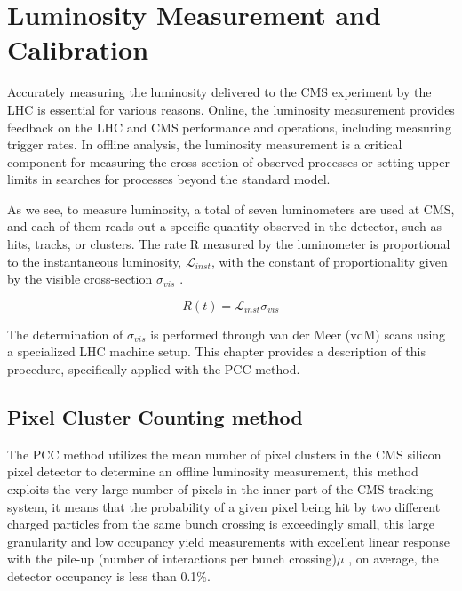 \chapter{Luminosity  Measurement and Calibration}
\label{ch3}

Accurately measuring the luminosity delivered to the CMS experiment by the LHC is essential for various reasons. Online, the luminosity measurement provides feedback on the LHC and CMS performance and operations, including measuring trigger rates. In offline analysis, the luminosity measurement is a critical component for measuring the cross-section of observed processes or setting upper limits in searches for processes beyond the standard model.

As we see, to measure luminosity, a total of seven luminometers are used at CMS, and each of them reads out a specific quantity observed in the detector, such as hits, tracks, or clusters. The rate R measured by the luminometer is proportional to the instantaneous luminosity, $\mathcal{L}_{inst}$, with the constant of proportionality given by the visible cross-section $\sigma_{vis}$ \cite{pas_18}.

\begin{equation}
R(t)=\mathcal{L}_{inst}\sigma_{vis}
\label{lumi_exp_gen}
\end{equation}

The determination of $\sigma_{vis}$ is performed through van der Meer (vdM) scans using a specialized LHC machine setup. This chapter provides a description of this procedure, specifically applied with the PCC method.

\section{Pixel Cluster Counting method}

The PCC method utilizes the mean number of pixel clusters in the CMS silicon pixel detector to determine an offline luminosity measurement, this method exploits the very large number of pixels in the inner part of the CMS tracking system, it means that the probability of a given pixel being hit by two different charged particles from the same bunch crossing is exceedingly small, this large granularity and low occupancy yield measurements with excellent linear response with the pile-up (number of interactions per bunch crossing)$\mu$ \cite{PCC_PAS_12_001},  on average, the detector occupancy is less than 0.1\%\cite{lumi_precise_2015_2016}.\\ 

